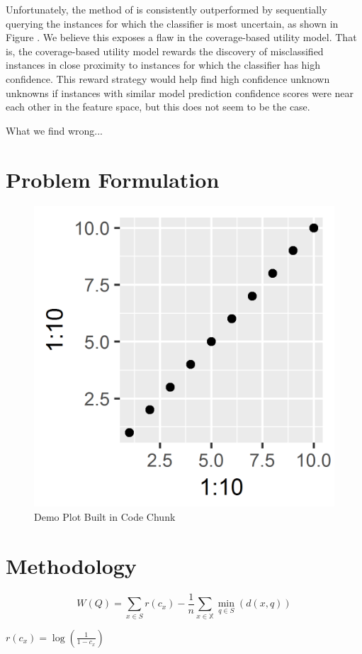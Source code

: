 \documentclass[letterpaper]{article} %
\begin{document}
Unfortunately, the method of \citet{Bansal2018} is consistently outperformed by sequentially querying the instances for which the classifier is most uncertain, as shown in Figure \cite{something}.  We believe this exposes a flaw in the coverage-based utility model.  That is, the coverage-based utility model rewards the discovery of misclassified instances in close proximity to instances for which the classifier has high confidence.  This reward strategy would help find high confidence unknown unknowns if instances with similar model prediction confidence scores were near each other in the feature space, but this does not seem to be the case.




What we find wrong...

\section{Problem Formulation}


\begin{figure}[hbtp]
\centering
  \includegraphics[width=.4\textwidth]{../experimentsAndPlots/demoplot.png}
  \caption{Demo Plot Built in Code Chunk}
  \label{fig:demo}
\end{figure}

\section{Methodology}

$$W(Q) = \sum_{x \in S} r \left(c_x\right) - \frac{1}{n} \sum_{x \in \mathbb{X}} \min_{q \in S}\left(d\left(x,q\right)\right)$$

$r\left(c_x\right) = \log\left(\frac{1}{1-c_x}\right)$
\end{document}
